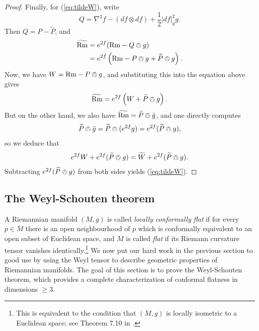 \documentclass{amsart}
\numberwithin{equation}{section}
\newcommand{\Rm}{\mathrm{Rm}}
\theoremstyle{plain}
\theoremstyle{definition}
\theoremstyle{remark}
\begin{document}
\begin{proof}
Finally, for (\ref{eq:tildeW}), write
\[Q = \nabla^2f - (df \otimes df) + \frac{1}{2}|df|_g^2 g.\]
Then $Q = P - \widetilde{P}$, and 
\begin{align*}
\widetilde{\Rm} &= e^{2f}(\Rm - Q \owedge g)\\
    &= e^{2f}\left(\Rm - P \owedge g + \widetilde{P} \owedge g \right).
\end{align*}
Now, we have $W = \Rm - P \owedge g$, and substituting this into the equation above gives
\[\widetilde{\Rm} = e^{2f}\left(W + \widetilde{P} \owedge g\right).\]
But on the other hand, we also have $\widetilde{\Rm} = \widetilde{P} \owedge \tilde{g}$, and one directly computes
\[\widetilde{P} \owedge \tilde{g} = \widetilde{P} \owedge (e^{2f}g) = e^{2f}(\widetilde{P} \owedge g),\]
so we deduce that
\[e^{2f}W + e^{2f} (\widetilde{P} \owedge g) = \widetilde{W} + e^{2f} (\widetilde{P} \owedge g).\]
Subtracting $e^{2f} (\widetilde{P} \owedge g)$ from both sides yields (\ref{eq:tildeW}).

\end{proof}

\subsection{The Weyl-Schouten theorem}A Riemannian manifold $(M, g)$ is called \emph{locally conformally flat} if for every $p \in M$ there is an open neighbourhood of $p$ which is conformally equivalent to an open subset of Euclidean space, and $M$ is called \emph{flat} if its Riemann curvature tensor vanishes identically.\footnote{This is equivalent to the condition that $(M,g)$ is locally isometric to a Euclidean space; see Theorem 7.10 in \cite{LeeRiemannian}.}
We now put our hard work in the previous section to good use by using the Weyl tensor to describe geometric properties of Riemannian manifolds. The goal of this section is to prove the Weyl-Schouten theorem, which provides a complete characterization of conformal flatness in dimensions $\ge 3$. 
\end{document}
